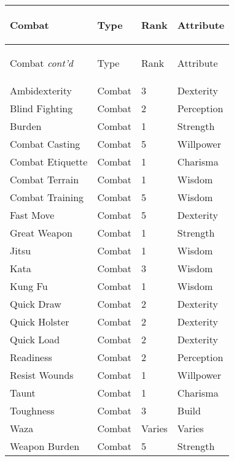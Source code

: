 \documentclass[twoside]{book}
\begin{document}
\begin{longtable}{p{1.25in}lll} 
  Combat& \begin{turn}{70}{Type}\end{turn}
          & \begin{turn}{70}{Rank}\end{turn}
          & \begin{turn}{70}{Attribute}\end{turn}
          \\
  \hline
  \hline
  \endfirsthead
  Combat \textit{cont'd}
        & \begin{turn}{70}{Type}\end{turn}
          & \begin{turn}{70}{Rank}\end{turn}
          & \begin{turn}{70}{Attribute}\end{turn}
           \\
  \hline
  \endhead
\raggedright Ambidexterity & Combat & 3 & Dexterity \tabularnewline
      \raggedright Blind Fighting & Combat & 2 & Perception \tabularnewline
      \raggedright Burden & Combat & 1 & Strength \tabularnewline
      \raggedright Combat Casting & Combat & 5 & Willpower \tabularnewline
      \raggedright Combat Etiquette & Combat & 1 & Charisma \tabularnewline
      \raggedright Combat Terrain & Combat & 1 & Wisdom \tabularnewline
      \raggedright Combat Training & Combat & 5 & Wisdom \tabularnewline
      \raggedright Fast Move & Combat & 5 & Dexterity \tabularnewline
      \raggedright Great Weapon & Combat & 1 & Strength \tabularnewline
      \raggedright Jitsu & Combat & 1 & Wisdom \tabularnewline
      \raggedright Kata & Combat & 3 & Wisdom \tabularnewline
      \raggedright Kung Fu & Combat & 1 & Wisdom \tabularnewline
      \raggedright Quick Draw & Combat & 2 & Dexterity \tabularnewline
      \raggedright Quick Holster & Combat & 2 & Dexterity \tabularnewline
      \raggedright Quick Load & Combat & 2 & Dexterity \tabularnewline
      \raggedright Readiness & Combat & 2 & Perception \tabularnewline
      \raggedright Resist Wounds & Combat & 1 & Willpower \tabularnewline
      \raggedright Taunt & Combat & 1 & Charisma \tabularnewline
      \raggedright Toughness & Combat & 3 & Build \tabularnewline
      \raggedright Waza & Combat & Varies & Varies \tabularnewline
      \raggedright Weapon Burden & Combat & 5 & Strength \tabularnewline
      
\end{longtable}
    
\end{document}
